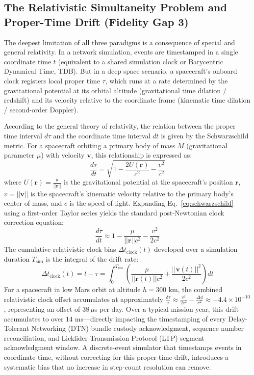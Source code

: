 \documentclass[a4paper,fleqn]{cas-sc}
\begin{document}
{\color{revcolor}\subsection{The Relativistic Simultaneity Problem and Proper-Time Drift (Fidelity Gap 3)}
The deepest limitation of all three paradigms is a consequence of special and general relativity. In a network simulation, events are timestamped in a single coordinate time $t$ (equivalent to a shared simulation clock or Barycentric Dynamical Time, TDB). But in a deep space scenario, a spacecraft's onboard clock registers local proper time $\tau$, which runs at a rate determined by the gravitational potential at its orbital altitude (gravitational time dilation / redshift) and its velocity relative to the coordinate frame (kinematic time dilation / second-order Doppler). 

According to the general theory of relativity, the relation between the proper time interval $d\tau$ and the coordinate time interval $dt$ is given by the Schwarzschild metric. For a spacecraft orbiting a primary body of mass $M$ (gravitational parameter $\mu$) with velocity $\mathbf{v}$, this relationship is expressed as:
\begin{equation}
    \frac{d\tau}{dt} = \sqrt{1 - \frac{2U(\mathbf{r})}{c^2} - \frac{v^2}{c^2}}
    \label{eq:schwarzschild}
\end{equation}
where $U(\mathbf{r}) = \frac{\mu}{||\mathbf{r}||}$ is the gravitational potential at the spacecraft's position $\mathbf{r}$, $v = ||\mathbf{v}||$ is the spacecraft's kinematic velocity relative to the primary body's center of mass, and $c$ is the speed of light.
Expanding Eq.~\eqref{eq:schwarzschild} using a first-order Taylor series yields the standard post-Newtonian clock correction equation:
\begin{equation}
    \frac{d\tau}{dt} \approx 1 - \frac{\mu}{||\mathbf{r}|| c^2} - \frac{v^2}{2 c^2}
    \label{eq:post_newtonian}
\end{equation}
The cumulative relativistic clock bias $\Delta t_{\text{clock}}(t)$ developed over a simulation duration $T_{\text{sim}}$ is the integral of the drift rate:
\begin{equation}
    \Delta t_{\text{clock}}(t) = t - \tau = \int_{0}^{T_{\text{sim}}} \left( \frac{\mu}{||\mathbf{r}(t)|| c^2} + \frac{||\mathbf{v}(t)||^2}{2 c^2} \right) dt
    \label{eq:clock_bias}
\end{equation}
For a spacecraft in low Mars orbit at altitude $h = 300$ km, the combined relativistic clock offset accumulates at approximately $\frac{\delta \tau}{\tau} \approx \frac{v^2}{2c^2} - \frac{\Delta \phi}{c^2} \approx -4.4 \times 10^{-10}$, representing an offset of $38\,\mu$s per day. Over a typical mission year, this drift accumulates to over $14$ ms---directly impacting the timestamping of every Delay-Tolerant Networking (DTN) bundle custody acknowledgment, sequence number reconciliation, and Licklider Transmission Protocol (LTP) segment acknowledgment window. A discrete-event simulator that timestamps events in coordinate time, without correcting for this proper-time drift, introduces a systematic bias that no increase in step-count resolution can remove.

}
\end{document}

